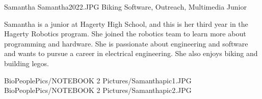 \insertbio
{Samantha}
{Samantha2022.JPG}
{Biking}
{Software, Outreach, Multimedia}
{Junior}
{
Samantha is a junior at Hagerty High School, and this is her third year in the Hagerty Robotics program. She joined the robotics team to learn more about programming and hardware. She is passionate about engineering and software and wants to pursue a career in electrical engineering. She also enjoys biking and building legos.

}
{BioPeoplePics/NOTEBOOK 2 Pictures/Samanthapic1.JPG}
{BioPeoplePics/NOTEBOOK 2 Pictures/Samanthapic2.JPG}

